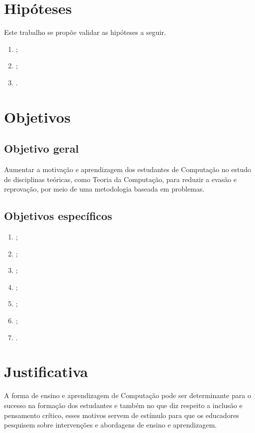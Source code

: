 \section{Hipóteses}
\label{sec-hipoteses}
Este trabalho se propõe validar as hipóteses a seguir.

\begin{enumerate}
\item{\label{h1ref} \hatexto;}
\item{\label{h2ref} \hbtexto;}
\item{\label{h3ref} \hctexto.}
\end{enumerate}

\section{Objetivos}
\label{sec-objetivos}

\subsection{Objetivo geral}
Aumentar a motivação e aprendizagem dos estudantes de Computação no estudo
de disciplinas teóricas, como Teoria da Computação, para reduzir a evasão e reprovação,
por meio de uma metodologia baseada em problemas.

\subsection{Objetivos específicos}
\begin{enumerate}
\item{\label{oe1ref} \oeatexto;}
\item{\label{oe2ref} \oebtexto;}
\item{\label{oe3ref} \oectexto;}
\item{\label{oe4ref} \oedtexto;}
\item{\label{oe5ref} \oeetexto;}
\item{\label{oe6ref} \oeftexto;}
\item{\label{oe7ref} \oegtexto.}
\end{enumerate}

\section{Justificativa}
A forma de ensino e aprendizagem de Computação pode
ser determinante para o sucesso na formação dos
estudantes e também no que diz respeito a inclusão
e pensamento crítico, esses motivos servem de estímulo
para que os educadores pesquisem sobre intervenções e
abordagens de ensino e aprendizagem.


